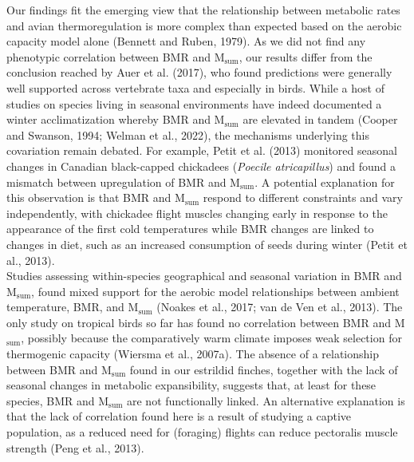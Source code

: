 \documentclass[10pt, twoside]{book} %
\begin{document}
Our findings fit the emerging view that the relationship between metabolic rates and avian thermoregulation is more complex than expected based on the aerobic capacity model alone (Bennett and Ruben, 1979). As we did not find any phenotypic correlation between BMR and M$_{\text{sum}}$, our results differ from the conclusion reached by Auer et al. (2017), who found predictions were generally well supported across vertebrate taxa and especially in birds. While a host of studies on species living in seasonal environments have indeed documented a winter acclimatization whereby BMR and M$_{\text{sum}}$ are elevated in tandem (Cooper and Swanson, 1994; Welman et al., 2022), the mechanisms underlying this covariation remain debated. For example, Petit et al. (2013) monitored seasonal changes in Canadian black-capped chickadees (\textit{Poecile atricapillus}) and found a mismatch between upregulation of BMR and M$_{\text{sum}}$. A potential explanation for this observation is that BMR and M$_{\text{sum}}$ respond to different constraints and vary independently, with chickadee flight muscles changing early in response to the appearance of the first cold temperatures while BMR changes are linked to changes in diet, such as an increased consumption of seeds during winter (Petit et al., 2013).\\

Studies assessing within-species geographical and seasonal variation in BMR and M$_{\text{sum}}$, found mixed support for the aerobic model relationships between ambient temperature, BMR, and M$_{\text{sum}}$ (Noakes et al., 2017; van de Ven et al., 2013). The only study on tropical birds so far has found no correlation between BMR and M$_{\text{sum}}$, possibly because the comparatively warm climate imposes weak selection for thermogenic capacity (Wiersma et al., 2007a). The absence of a relationship between BMR and M$_{\text{sum}}$ found in our estrildid finches, together with the lack of seasonal changes in metabolic expansibility, suggests that, at least for these species, BMR and M$_{\text{sum}}$ are not functionally linked. An alternative explanation is that the lack of correlation found here is a result of studying a captive population, as a reduced need for (foraging) flights can reduce pectoralis muscle strength (Peng et al., 2013).\\
\end{document}
